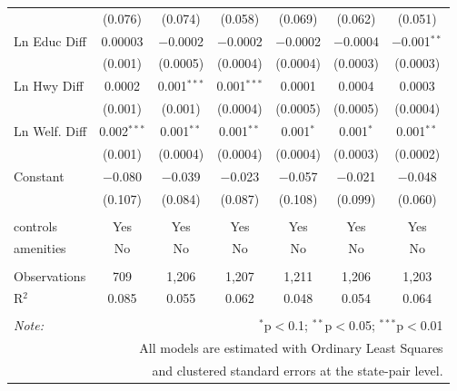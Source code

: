 \begin{table}[!htbp]
\begin{tabular}{@{\extracolsep{5pt}}lcccccc}
  & (0.076) & (0.074) & (0.058) & (0.069) & (0.062) & (0.051) \\ 
  Ln Educ Diff & 0.00003 & $-$0.0002 & $-$0.0002 & $-$0.0002 & $-$0.0004 & $-$0.001$^{**}$ \\ 
  & (0.001) & (0.0005) & (0.0004) & (0.0004) & (0.0003) & (0.0003) \\ 
  Ln Hwy Diff & 0.0002 & 0.001$^{***}$ & 0.001$^{***}$ & 0.0001 & 0.0004 & 0.0003 \\ 
  & (0.001) & (0.001) & (0.0004) & (0.0005) & (0.0005) & (0.0004) \\ 
  Ln Welf. Diff & 0.002$^{***}$ & 0.001$^{**}$ & 0.001$^{**}$ & 0.001$^{*}$ & 0.001$^{*}$ & 0.001$^{**}$ \\ 
  & (0.001) & (0.0004) & (0.0004) & (0.0004) & (0.0003) & (0.0002) \\ 
  Constant & $-$0.080 & $-$0.039 & $-$0.023 & $-$0.057 & $-$0.021 & $-$0.048 \\ 
  & (0.107) & (0.084) & (0.087) & (0.108) & (0.099) & (0.060) \\ 
 \hline \\[-1.8ex] 
controls & Yes & Yes & Yes & Yes & Yes & Yes \\ 
amenities & No & No & No & No & No & No \\ 
\hline \\[-1.8ex] 
Observations & 709 & 1,206 & 1,207 & 1,211 & 1,206 & 1,203 \\ 
R$^{2}$ & 0.085 & 0.055 & 0.062 & 0.048 & 0.054 & 0.064 \\ 
\hline 
\hline \\[-1.8ex] 
\textit{Note:}  & \multicolumn{6}{r}{$^{*}$p$<$0.1; $^{**}$p$<$0.05; $^{***}$p$<$0.01} \\ 
 & \multicolumn{6}{r}{All models are estimated with Ordinary Least Squares} \\ 
 & \multicolumn{6}{r}{and clustered standard errors at the state-pair level.} \\ 
\end{tabular} 
\end{table} 
